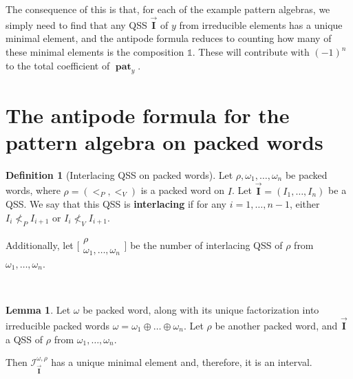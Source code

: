 \documentclass[12pt, reqno]{amsart}
\theoremstyle{definition}
\newtheorem{lm}[thm]{Lemma}
\newtheorem{defin}[thm]{Definition}
\newcommand{\III}{\vec{\mathbf{I}}}
\DeclareMathOperator{\pat}{\mathbf{pat}}
\begin{document}
The consequence of this is that, for each of the example pattern algebras, we simply need to find that any QSS $\III$ of $y$ from irreducible elements has a unique minimal element, and the antipode formula reduces to counting how many of these minimal elements is the composition $\mathbb{1}$.
These will contribute with $(-1)^n$ to the total coefficient of $\pat_y$.

\section{The antipode formula for the pattern algebra on packed words \label{sec:formula_packed}}

\begin{defin}[Interlacing QSS on packed words]
Let $\rho, \omega_1, \dots, \omega_n$ be packed words, where $\rho = (<_P, <_V)$ is a packed word on $I$.
Let $\III = (I_1, \dots, I_n)$ be a QSS.
We say that this QSS is \textbf{interlacing} if for any $i = 1, \dots, n-1$, either $I_i \not<_P I_{i+1}$ or $I_i \not<_V I_{i+1}$.

Additionally, let $ \bigl[\!\begin{smallmatrix} \rho  \\ \omega_1, \dots, \omega_n \end{smallmatrix}\!\bigr]$ be the number of interlacing QSS of $\rho$ from $\omega_1, \dots, \omega_n$.
\end{defin}

\

\begin{lm}\label{lm:minpacked}
Let $\omega$ be  packed word, along with its unique factorization into irreducible packed words $\omega = \omega_1 \oplus \dots \oplus \omega_n$.
Let $\rho$ be another packed word, and $\III$ a QSS of $\rho$ from $\omega_1, \dots , \omega_n$.

Then $\mathcal I^{\omega, \rho}_{\III}$ has a unique minimal element and, therefore, it is an interval.
\end{lm}
\end{document}
